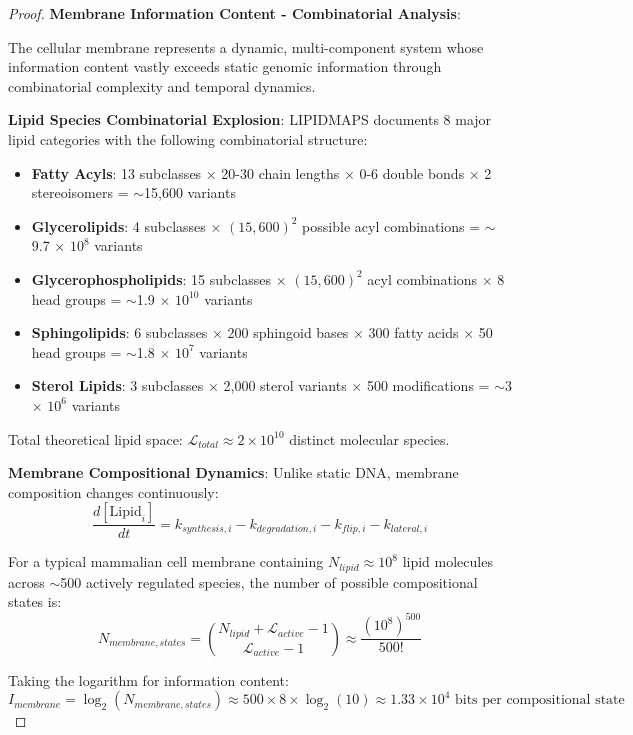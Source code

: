 \documentclass[12pt,a4paper]{article}
\begin{document}
\begin{proof}
\textbf{Membrane Information Content - Combinatorial Analysis}:

The cellular membrane represents a dynamic, multi-component system whose information content vastly exceeds static genomic information through combinatorial complexity and temporal dynamics.

\textbf{Lipid Species Combinatorial Explosion}: LIPIDMAPS documents 8 major lipid categories with the following combinatorial structure:
\begin{itemize}
\item \textbf{Fatty Acyls}: 13 subclasses × 20-30 chain lengths × 0-6 double bonds × 2 stereoisomers = $\sim$15,600 variants
\item \textbf{Glycerolipids}: 4 subclasses × $(15,600)^2$ possible acyl combinations = $\sim$9.7 × $10^8$ variants  
\item \textbf{Glycerophospholipids}: 15 subclasses × $(15,600)^2$ acyl combinations × 8 head groups = $\sim$1.9 × $10^{10}$ variants
\item \textbf{Sphingolipids}: 6 subclasses × 200 sphingoid bases × 300 fatty acids × 50 head groups = $\sim$1.8 × $10^7$ variants
\item \textbf{Sterol Lipids}: 3 subclasses × 2,000 sterol variants × 500 modifications = $\sim$3 × $10^6$ variants
\end{itemize}

Total theoretical lipid space: $\mathcal{L}_{total} \approx 2 \times 10^{10}$ distinct molecular species.

\textbf{Membrane Compositional Dynamics}: Unlike static DNA, membrane composition changes continuously:
\begin{equation}
\frac{d[\text{Lipid}_i]}{dt} = k_{synthesis,i} - k_{degradation,i} - k_{flip,i} - k_{lateral,i}
\end{equation}

For a typical mammalian cell membrane containing $N_{lipid} \approx 10^8$ lipid molecules across $\sim$500 actively regulated species, the number of possible compositional states is:
\begin{equation}
N_{membrane,states} = \binom{N_{lipid} + \mathcal{L}_{active} - 1}{\mathcal{L}_{active} - 1} \approx \frac{(10^8)^{500}}{500!}
\end{equation}

Taking the logarithm for information content:
\begin{equation}
I_{membrane} = \log_2(N_{membrane,states}) \approx 500 \times 8 \times \log_2(10) \approx 1.33 \times 10^4 \text{ bits per compositional state}
\end{equation}


\end{proof}
\end{document}
